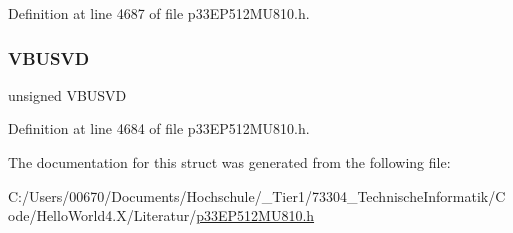 Definition at line 4687 of file p33\+E\+P512\+M\+U810.\+h.

\mbox{\label{structtag_u1_o_t_g_s_t_a_t_b_i_t_s_afe00aa21bc660bc6c6d86b3928f5155a}} 
\subsubsection{\texorpdfstring{V\+B\+U\+S\+VD}{VBUSVD}}
{\footnotesize\ttfamily unsigned V\+B\+U\+S\+VD}



Definition at line 4684 of file p33\+E\+P512\+M\+U810.\+h.



The documentation for this struct was generated from the following file\+:\begin{DoxyCompactItemize}
\item 
C\+:/\+Users/00670/\+Documents/\+Hochschule/\+\_\+\+Tier1/73304\+\_\+\+Technische\+Informatik/\+Code/\+Hello\+World4.\+X/\+Literatur/\hyperlink{p33_e_p512_m_u810_8h}{p33\+E\+P512\+M\+U810.\+h}\end{DoxyCompactItemize}
